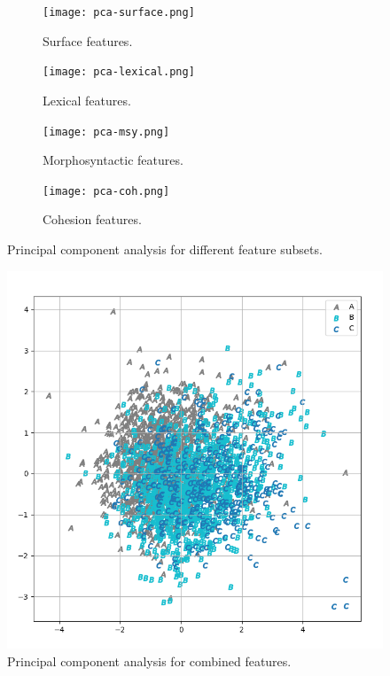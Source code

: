 \begin{figure}[H]
\centering
\begin{subfigure}{0.5\textwidth}
  \centering
  \texttt{[image: pca-surface.png]}
   \caption{Surface features.}
\end{subfigure}%
\begin{subfigure}{0.5\textwidth}
  \centering
  \texttt{[image: pca-lexical.png]}
  \caption{Lexical features.}
\end{subfigure}%

\begin{subfigure}{0.5\textwidth}
  \centering
  \texttt{[image: pca-msy.png]}
  \caption{Morphosyntactic features.}
\end{subfigure}%
\begin{subfigure}{0.5\textwidth}
  \centering
  \texttt{[image: pca-coh.png]}
  \caption{Cohesion features.}
\end{subfigure}
\caption{Principal component analysis for different feature subsets.}
\label{fig:pca-sub}
\end{figure}


\begin{figure}[H]
    \centering
    \includegraphics[width=1\linewidth]{images/pca-all.png}
    \caption{Principal component analysis for combined features.}
    \label{fig:pca-all}
\end{figure}
